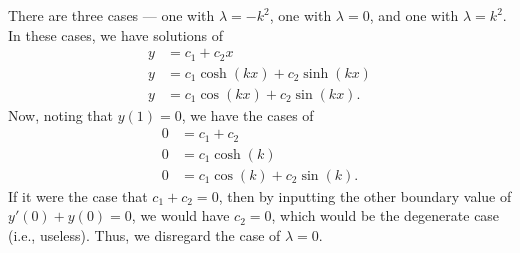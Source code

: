 \documentclass[10pt]{mypackage}
\begin{document}
\begin{solution}[11.4, Problem 2]
  There are three cases --- one with $\lambda = -k^2$, one with $\lambda = 0$, and one with $\lambda = k^2$. In these cases, we have solutions of
  \begin{align*}
    y &= c_1 + c_2 x \tag*{$\lambda = 0$}\\
    y &= c_1\cosh\left( kx \right) + c_2\sinh\left( kx \right)  \tag*{$\lambda = k^2$}\\
    y &= c_1\cos\left( kx \right) + c_2\sin\left( kx \right).  \tag*{$\lambda = -k^2$}
  \end{align*}
  Now, noting that $y(1) = 0$, we have the cases of
  \begin{align*}
    0 &= c_1 + c_2\tag*{$\lambda = 0$}\\
    0 &= c_1\cosh\left( k \right) \tag*{$\lambda = k^2$}\\
    0 &= c_1 \cos\left( k \right) + c_2\sin\left( k \right). \tag*{$\lambda = -k^2$}
  \end{align*}
  If it were the case that $c_1 + c_2 = 0$, then by inputting the other boundary value of $y'(0) + y(0) = 0$, we would have $c_2 = 0$, which would be the degenerate case (i.e., useless). Thus, we disregard the case of $\lambda = 0$.
\end{solution}
\begin{solution}[11.4, Problem 4]

\end{solution}
\begin{solution}[11.4, Problem 8]

\end{solution}
\begin{solution}[11.4, Problem 10]

\end{solution}
\begin{solution}[12.3, Problem 2]

\end{solution}
\begin{solution}[12.3, Problem 4]

\end{solution}
\end{document}
